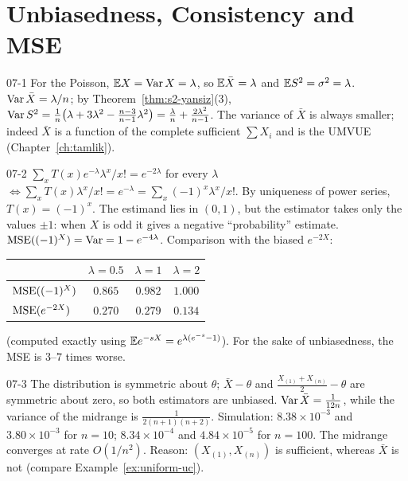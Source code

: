 \section{Unbiasedness, Consistency and MSE}

\begin{solution}{07-1}
For the Poisson, $\mathbb{E} X=\operatorname{Var} X=\lambda$, so $\mathbb{E}\bar X=\lambda$ and $\mathbb{E} S^2=\sigma^2=\lambda$. $\operatorname{Var}\bar X=\lambda/n$; by Theorem~\ref{thm:s2-yansiz}(3),
$\operatorname{Var} S^2=\frac1n\big(\lambda+3\lambda^2-\frac{n-3}{n-1}\lambda^2\big)=\frac\lambda n+\frac{2\lambda^2}{n-1}$. The variance of $\bar X$ is always smaller; indeed $\bar X$ is a function of the complete sufficient $\sum X_i$ and is the UMVUE (Chapter~\ref{ch:tamlik}).
\end{solution}

\begin{solution}{07-2}
$\sum_xT(x)e^{-\lambda}\lambda^x/x!=e^{-2\lambda}$ for every $\lambda$ $\iff\sum_xT(x)\lambda^x/x!=e^{-\lambda}=\sum_x(-1)^x\lambda^x/x!$. By uniqueness of power series, $T(x)=(-1)^x$. The estimand lies in $(0,1)$, but the estimator takes only the values $\pm1$: when $X$ is odd it gives a negative ``probability'' estimate. $\operatorname{MSE}((-1)^X)=\operatorname{Var}=1-e^{-4\lambda}$. Comparison with the biased $e^{-2X}$:
\begin{center}\small
\begin{tabular}{@{}lccc@{}}\toprule
 & $\lambda=0.5$ & $\lambda=1$ & $\lambda=2$\\\midrule
$\operatorname{MSE}((-1)^X)$ & $0.865$ & $0.982$ & $1.000$\\
$\operatorname{MSE}(e^{-2X})$ & $0.270$ & $0.279$ & $0.134$\\\bottomrule
\end{tabular}
\end{center}
(computed exactly using $\mathbb{E} e^{-sX}=e^{\lambda(e^{-s}-1)}$). For the sake of unbiasedness, the MSE is $3$--$7$ times worse.
\end{solution}

\begin{solution}{07-3}
The distribution is symmetric about $\theta$; $\bar X-\theta$ and $\frac{X_{(1)}+X_{(n)}}2-\theta$ are symmetric about zero, so both estimators are unbiased. $\operatorname{Var}\bar X=\frac{1}{12n}$, while the variance of the midrange is $\frac{1}{2(n+1)(n+2)}$. Simulation: $8.38\times10^{-3}$ and $3.80\times10^{-3}$ for $n=10$; $8.34\times10^{-4}$ and $4.84\times10^{-5}$ for $n=100$. The midrange converges at rate $O(1/n^2)$. Reason: $(X_{(1)},X_{(n)})$ is sufficient, whereas $\bar X$ is not (compare Example~\ref{ex:uniform-uc}).
\end{solution}

